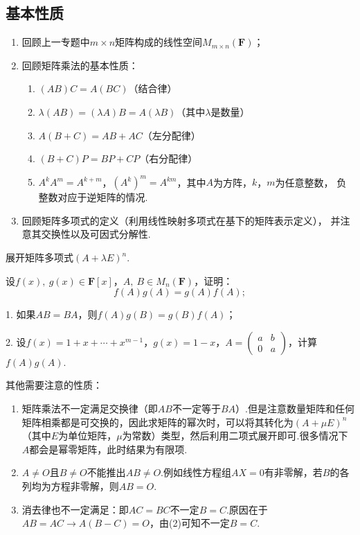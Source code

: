 \subsection{基本性质}
\begin{enumerate}
	\item 回顾上一专题中$m \times n$矩阵构成的线性空间$M_{m \times n}(\mathbf{F})$；
	\item 回顾矩阵乘法的基本性质：
	\begin{enumerate}
		\item $(AB)C=A(BC)$（结合律）
		\item $\lambda(AB)=(\lambda A)B=A(\lambda B)$（其中$\lambda$是数量）
		\item $A(B+C)=AB+AC$（左分配律）
		\item $(B+C)P=BP+CP$（右分配律）
		\item $A^kA^m=A^{k+m}$，$(A^k)^m=A^{km}$，其中$A$为方阵，$k$，$m$为任意整数，
		负整数对应于逆矩阵的情况.
	\end{enumerate}
	\item 回顾矩阵多项式的定义（利用线性映射多项式在基下的矩阵表示定义），
	并注意其交换性以及可因式分解性.
\end{enumerate}
\begin{example}
	展开矩阵多项式$(A+\lambda E)^n$.
\end{example}
\begin{example}
	设$f(x),\ g(x) \in \mathbf{F}[x]$，$A,\ B \in M_n(\mathbf{F})$，证明：
	$$f(A)g(A)=g(A)f(A);$$
	
	\textup{1. }如果$AB=BA$，则$f(A)g(B)=g(B)f(A)$\textup{；}

	\textup{2. }设$f(x)=1+x+\cdots+x^{m-1}$，$g(x)=1-x$，$A=\begin{pmatrix}
		a & b \\ 0 & a
	\end{pmatrix}$，计算$f(A)g(A)$.
\end{example}
其他需要注意的性质：
\begin{enumerate}
	\item 矩阵乘法不一定满足交换律（即$AB$不一定等于$BA$）.但是注意数量矩阵和任何矩阵相乘都是可交换的，因此求矩阵的幂次时，可以将其转化为$(A+\mu E)^n$（其中$E$为单位矩阵，$\mu$为常数）类型，然后利用二项式展开即可.很多情况下$A$都会是幂零矩阵，此时结果为有限项.
	\item $A\neq O$且$B\neq O$不能推出$AB\neq O$.例如线性方程组$AX = 0$有非零解，若$B$的各列均为方程非零解，则$AB = O$.
	\item 消去律也不一定满足：即$AC = BC$不一定$B = C$.原因在于$AB=AC \to A(B-C)=O$，由(2)可知不一定$B = C$.
\end{enumerate}

